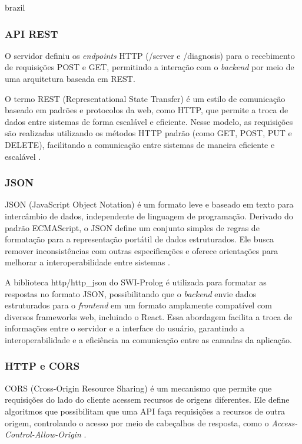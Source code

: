 \begin{otherlanguage*}{brazil}
\subsubsection{API REST}

O servidor definiu os \textit{endpoints} HTTP (/server e /diagnosis) para o recebimento de requisições POST e GET, permitindo a interação com o \textit{backend} por meio de uma arquitetura baseada em REST. 

O termo REST (Representational State Transfer) é um estilo de comunicação baseado em padrões e protocolos da web, como HTTP, que permite a troca de dados entre sistemas de forma escalável e eficiente. Nesse modelo, as requisições são realizadas utilizando os métodos HTTP padrão (como GET, POST, PUT e DELETE), facilitando a comunicação entre sistemas de maneira eficiente e escalável \cite{whatisrest}.

\subsubsection{JSON}

JSON (JavaScript Object Notation) é um formato leve e baseado em texto para intercâmbio de dados, independente de linguagem de programação. Derivado do padrão ECMAScript, o JSON define um conjunto simples de regras de formatação para a representação portátil de dados estruturados. Ele busca remover inconsistências com outras especificações e oferece orientações para melhorar a interoperabilidade entre sistemas \cite{whatisjson}.

A biblioteca http/http\_json do SWI-Prolog é utilizada para formatar as respostas no formato JSON, possibilitando que o \textit{backend} envie dados estruturados para o \textit{frontend} em um formato amplamente compatível com diversos frameworks web, incluindo o React. Essa abordagem facilita a troca de informações entre o servidor e a interface do usuário, garantindo a interoperabilidade e a eficiência na comunicação entre as camadas da aplicação.

\subsubsection{HTTP e CORS}

CORS (Cross-Origin Resource Sharing) é um mecanismo que permite que requisições do lado do cliente acessem recursos de origens diferentes. Ele define algoritmos que possibilitam que uma API faça requisições a recursos de outra origem, controlando o acesso por meio de cabeçalhos de resposta, como o \textit{Access-Control-Allow-Origin} \cite{whatiscors}.


\end{otherlanguage*}
